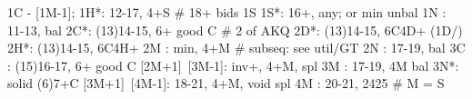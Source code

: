 1C - [1M-1];
1H*: 12-17, 4+S  # 18+ bids 1S
1S*: 16+, any; or min unbal
1N : 11-13, bal
2C*: (13)14-15, 6+ good C  # 2 of AKQ
2D*: (13)14-15, 6C4D+
(1D/) 2H*: (13)14-15, 6C4H+ 
2M : min, 4+M  # subseq: see util/GT
2N : 17-19, bal
3C : (15)16-17, 6+ good C 
[2M+1]~[3M-1]: inv+, 4+M, spl
3M : 17-19, 4M bal
3N*: solid (6)7+C
[3M+1]~[4M-1]: 18-21, 4+M, void spl
4M : 20-21, 2425
# M = S
